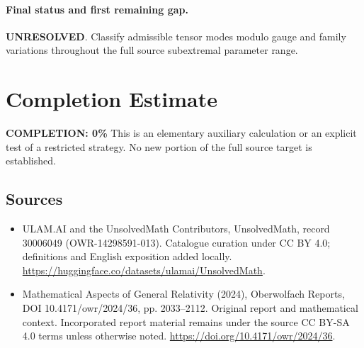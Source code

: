 \documentclass[11pt]{article}
\begin{document}
\paragraph{Final status and first remaining gap.}
\textbf{UNRESOLVED}. Classify admissible tensor modes modulo gauge and family variations throughout the full source subextremal parameter range.

\section{Completion Estimate}
\noindent\textbf{COMPLETION: 0\%}
This is an elementary auxiliary calculation or an explicit test of a restricted strategy. No new portion of the full source target is established.

\subsection{Sources}
\begin{itemize}
\item[\hypertarget{source:30006049:1}{S1}] ULAM.AI and the UnsolvedMath Contributors, UnsolvedMath, record 30006049 (OWR-14298591-013). Catalogue curation under CC BY 4.0; definitions and English exposition added locally.
\url{https://huggingface.co/datasets/ulamai/UnsolvedMath}.
\item[\hypertarget{source:30006049:2}{S2}] Mathematical Aspects of General Relativity (2024), Oberwolfach Reports, DOI 10.4171/owr/2024/36, pp. 2033--2112. Original report and mathematical context. Incorporated report material remains under the source CC BY-SA 4.0 terms unless otherwise noted.
\url{https://doi.org/10.4171/owr/2024/36}.
\end{itemize}
\label{end:30006049}
\end{document}

